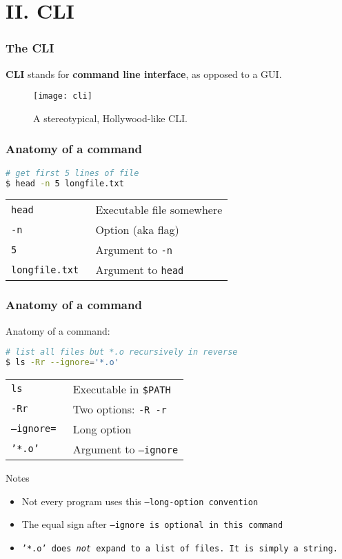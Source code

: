 \section{II. CLI}
\begin{frame}
\frametitle{The CLI}
\textbf{CLI} stands for \textbf{command line interface}, as opposed to a GUI.

\begin{figure}[h]
    \centering
    \texttt{[image: cli]}
    \caption{A stereotypical, Hollywood-like CLI.}
\end{figure}
\end{frame}

\begin{frame}[fragile]
\frametitle{Anatomy of a command}
\begin{lstlisting}[language=bash]
# get first 5 lines of file
$ head -n 5 longfile.txt
\end{lstlisting}
\begin{tabular}{ll}
    \tt{head}            & Executable file somewhere \\
    \tt{-n}              & Option (aka flag) \\
    \tt{5}               & Argument to \tt{-n} \\
    \tt{longfile.txt}    & Argument to \tt{head}
\end{tabular}
\end{frame}

\begin{frame}[fragile]
\frametitle{Anatomy of a command}
Anatomy of a command:
\begin{lstlisting}[language=bash]
# list all files but *.o recursively in reverse
$ ls -Rr --ignore='*.o'
\end{lstlisting}
\begin{tabular}{ll}
    \tt{ls}             & Executable in \tt{\$PATH} \\
    \tt{-Rr}            & Two options: \tt{-R -r} \\
    \tt{--ignore=}      & Long option \\
    \tt{'*.o'}          & Argument to \tt{--ignore}
\end{tabular}
\begin{block}{Notes}
    \begin{itemize}
        \item Not every program uses this \tt{--long-option} convention
        \item The equal sign after \tt{--ignore} is optional in this command
        \item \tt{'*.o'} does \textit{not} expand to a list of files.
            It is simply a string.
    \end{itemize}
\end{block}
\end{frame}

